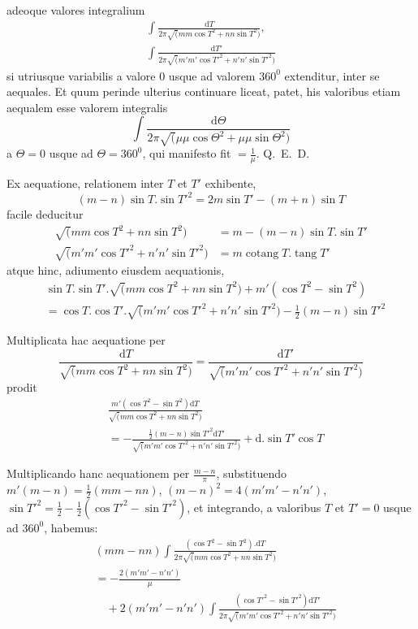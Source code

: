 adeoque valores integralium
\[
\begin{gathered}\int\frac{\mathrm{d}T}{2\pi\surd(mm\cos T^2+nn\sin T^2)},\\[7pt]
\int\frac{\mathrm{d}T'}{2\pi\surd(m'm'\cos T'^2+n'n'\sin T'^2)}\end{gathered}
\]
si utriusque variabilis a valore $0$ usque ad valorem $360^{0}$ extenditur, inter se aequales. Et quum perinde ulterius continuare liceat, patet, his valoribus etiam
aequalem esse valorem integralis
\[
\int\frac{\mathrm{d}\Theta}{2\pi\surd(\mu\mu\cos\Theta^2+\mu\mu\sin\Theta^2)}
\]
a $\Theta=0$ usque ad $\Theta=360^{0}$, qui manifesto fit $=\frac{1}{\mu}$. Q.~E.~D.

Ex aequatione, relationem inter $T$ et $T'$ exhibente,
\[
(m-n)\sin T.\sin T'^2=2m\sin T'-(m+n)\sin T
\]
facile deducitur
\[
\begin{aligned}
\surd(mm\cos T^2+nn\sin T^2)&=m-(m-n)\sin T.\sin T'\\[6pt]
\surd(m'm'\cos T'^2+n'n'\sin T'^2)&=m\mathop{\mathrm{cotang}}T.\mathop{\mathrm{tang}}T'
\end{aligned}
\]
atque hinc, adiumento eiusdem aequationis,
\[
\begin{aligned}
&\sin T.\sin T'.\surd(mm\cos T^2+nn\sin T^2)+m'(\cos T^2-\sin T^2)\\[6pt]
&=\cos T.\cos T'.\surd(m'm'\cos T'^2+n'n'\sin T'^2)-\tfrac12(m-n)\sin T'^2
\end{aligned}
\]
\par Multiplicata hac aequatione per
\[
\frac{\mathrm{d}T}{\surd(mm\cos T^2+nn\sin T^2)}
=\frac{\mathrm{d}T'}{\surd(m'm'\cos T'^2+n'n'\sin T'^2)}
\]
prodit
\[
\begin{aligned}&\frac{m'(\cos T^2-\sin T^2)\mathrm{d}T}{\surd(mm\cos T^2+nn\sin T^2)}\\[7pt]&=-\frac{\tfrac12(m-n)\sin T'^2\mathrm{d}T'}{\surd(m'm'\cos T'^2+n'n'\sin T'^2)}+\mathrm{d}.\sin T'\cos T\end{aligned}
\]
\par Multiplicando hanc aequationem per $\frac{m-n}{\pi}$, substituendo
$m'(m-n)=\tfrac12(mm-nn)$,
$(m-n)^2=4(m'm'-n'n')$,
$\sin T'^2=\tfrac12-\tfrac12(\cos T'^2-\sin T'^2)$, et integrando, a valoribus $T$ et $T'=0$ usque ad $360^{0}$, habemus:
\[
\begin{aligned}
&(mm-nn)\int\frac{(\cos T^2-\sin T^2).\mathrm{d}T}{2\pi\surd(mm\cos T^2+nn\sin T^2)}\\[6pt]
&=-\frac{2(m'm'-n'n')}{\mu}\\[7pt]&\quad+2(m'm'-n'n')\int\frac{(\cos T'^2-\sin T'^2)\mathrm{d}T'}{2\pi\surd(m'm'\cos T'^2+n'n'\sin T'^2)}
\end{aligned}
\]
